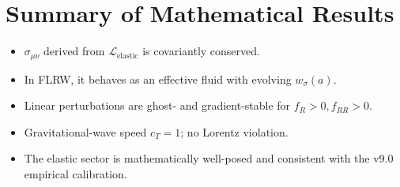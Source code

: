 \documentclass[12pt,a4paper]{article}
\begin{document}
\section{Summary of Mathematical Results}
\begin{itemize}
\item $\sigma_{\mu\nu}$ derived from $\mathcal{L}_{\mathrm{elastic}}$ is covariantly conserved.
\item In FLRW, it behaves as an effective fluid with evolving $w_\sigma(a)$.
\item Linear perturbations are ghost- and gradient-stable for $f_R>0,f_{RR}>0$.
\item Gravitational-wave speed $c_T=1$; no Lorentz violation.
\item The elastic sector is mathematically well-posed and consistent with the v9.0 empirical calibration.
\end{itemize}
\end{document}
